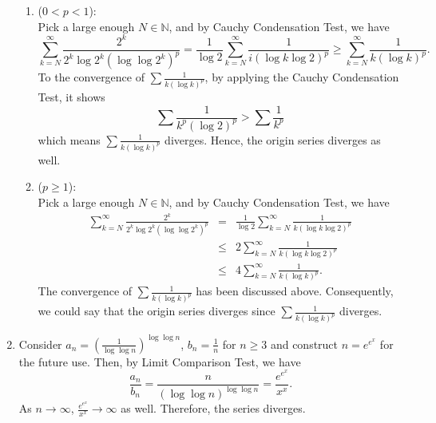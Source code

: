 \documentclass[a4paper]{article}
\newcommand{\N}{\mathbb{N}}
\theoremstyle{plain}
\begin{document}
\begin{enumerate}[label = (\alph*)]
\begin{enumerate}
            \item ($0<p<1$): \\
                Pick a large enough $N \in \N$, and by Cauchy Condensation Test, we have
                \[
                    \sum^\infty_{k=N}\frac{2^k}{2^k\log 2^k(\log\log 2^k)^p}
                    = \frac{1}{\log 2}\sum^\infty_{k=N}\frac{1}{i(\log k \log 2)^p}
                    \geq \sum^\infty_{k=N}\frac{1}{k(\log k)^p}.
                \]
                To the convergence of $\sum\frac{1}{k(\log k)^p}$, by applying the Cauchy Condensation Test,
                it shows
                \[
                    \sum\frac{1}{k^p(\log 2)^p} > \sum\frac{1}{k^p}
                \]
                which means $\sum\frac{1}{k(\log k)^p}$ diverges. Hence, the origin series diverges
                as well.

            \item ($p \geq 1$): \\
                Pick a large enough $N \in \N$, and by Cauchy Condensation Test, we have
                \[
                    \begin{array}{RCL}
                        \sum^\infty_{k=N}\frac{2^k}{2^k\log 2^k(\log\log 2^k)^p} 
                        & = & \frac{1}{\log 2}\sum^\infty_{k=N}\frac{1}{k(\log k \log 2)^p} \\
                        & \leq & 2\sum^\infty_{k=N}\frac{1}{k(\log k \log 2)^p} \\
                        & \leq & 4\sum^\infty_{k=N}\frac{1}{k(\log k)^p}.
                    \end{array}
                \]
                The convergence of $\sum\frac{1}{k(\log k)^p}$ has been discussed above.
                Consequently, we could say that the origin series diverges since
                $\sum\frac{1}{k(\log k)^p}$ diverges.

        \end{enumerate}

    \item Consider $a_n = \left(\frac{1}{\log\log n}\right)^{\log\log n}$, 
        $b_n = \frac{1}{n}$ for $n\geq 3$ and construct $n = e^{e^x}$ for the future use. Then,
        by Limit Comparison Test, we have
        \[
            \frac{a_n}{b_n} = \frac{n}{\left(\log\log n\right)^{\log\log n}} = \frac{e^{e^x}}{x^x}.
        \]
        As $n\to\infty$, $\frac{e^{e^x}}{x^x} \to \infty$ as well. Therefore, the series diverges.
\end{enumerate}
\end{document}
